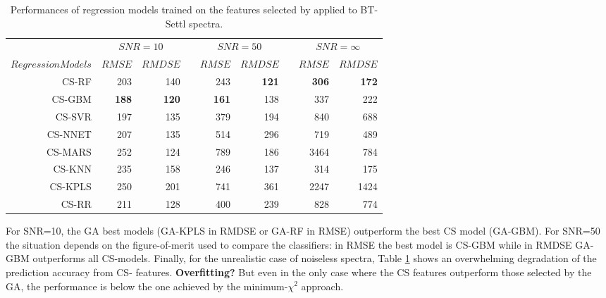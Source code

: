 \begin{table}
\begin{center}
\begin{tabular}{@{}rrrcrrcrr@{}}\toprule
& \multicolumn{2}{c}{$SNR = 10$} & \phantom{ab}& \multicolumn{2}{c}{$SNR = 50$} &
\phantom{ab} & \multicolumn{2}{c}{$SNR = \infty$}\\
\cmidrule{2-3} \cmidrule{5-6} \cmidrule{8-9}
$Regression Models$ & $RMSE$ & $RMDSE$ && $RMSE$ & $RMDSE$     && $RMSE$       & $RMDSE$ \\ \midrule
CS-RF   & 203       & 140       && 243       & {\bf 121} &&  {\bf 306} &  {\bf 172}  \\
CS-GBM  & {\bf 188} & {\bf 120} && {\bf 161} & 138       &&  337       &  222  \\
CS-SVR  & 197       & 135       && 379       & 194       &&  840       &  688  \\
CS-NNET & 207       & 135       && 514       & 296       &&  719       &  489  \\
CS-MARS & 252       & 124       && 789       & 186       && 3464       &  784  \\
CS-KNN  & 235       & 158       && 246       & 137       &&  314       &  175  \\
CS-KPLS & 250       & 201       && 741       & 361       && 2247       & 1424  \\
CS-RR   & 211       & 128       && 400       & 239       &&  828       &  774  \\

\hline
\end{tabular}
\caption {Performances of regression models trained on the features
  selected by \cite{cesetti} applied to BT-Settl spectra.}
\label{tab:tab_CS_Model}
\end{center}
\end{table}

For SNR=10, the GA best models (GA-KPLS in RMDSE or GA-RF in RMSE)
outperform the best CS model (GA-GBM). For SNR=50 the situation
depends on the figure-of-merit used to compare the classifiers: in
RMSE the best model is CS-GBM while in RMDSE GA-GBM outperforms all
CS-models. Finally, for the unrealistic case of noiseless spectra,
Table \ref{tab:tab_CS_Model} shows an overwhelming degradation of the
prediction accuracy from CS- features. {\bf Overfitting?} But even in
the only case where the CS features outperform those selected by the
GA, the performance is below the one achieved by the minimum-$\chi^2$
approach.

